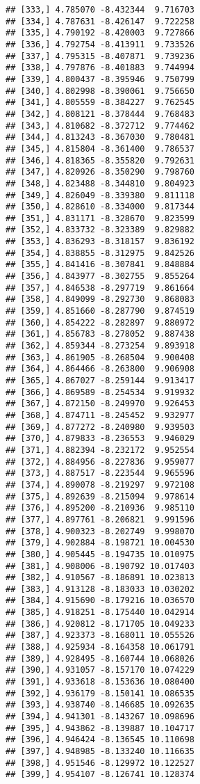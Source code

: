 \documentclass[]{book}
\theoremstyle{definition}
\theoremstyle{definition}
\theoremstyle{definition}
\theoremstyle{remark}
\begin{document}
\begin{verbatim}
## [333,] 4.785070 -8.432344  9.716703
## [334,] 4.787631 -8.426147  9.722258
## [335,] 4.790192 -8.420003  9.727866
## [336,] 4.792754 -8.413911  9.733526
## [337,] 4.795315 -8.407871  9.739236
## [338,] 4.797876 -8.401883  9.744994
## [339,] 4.800437 -8.395946  9.750799
## [340,] 4.802998 -8.390061  9.756650
## [341,] 4.805559 -8.384227  9.762545
## [342,] 4.808121 -8.378444  9.768483
## [343,] 4.810682 -8.372712  9.774462
## [344,] 4.813243 -8.367030  9.780481
## [345,] 4.815804 -8.361400  9.786537
## [346,] 4.818365 -8.355820  9.792631
## [347,] 4.820926 -8.350290  9.798760
## [348,] 4.823488 -8.344810  9.804923
## [349,] 4.826049 -8.339380  9.811118
## [350,] 4.828610 -8.334000  9.817344
## [351,] 4.831171 -8.328670  9.823599
## [352,] 4.833732 -8.323389  9.829882
## [353,] 4.836293 -8.318157  9.836192
## [354,] 4.838855 -8.312975  9.842526
## [355,] 4.841416 -8.307841  9.848884
## [356,] 4.843977 -8.302755  9.855264
## [357,] 4.846538 -8.297719  9.861664
## [358,] 4.849099 -8.292730  9.868083
## [359,] 4.851660 -8.287790  9.874519
## [360,] 4.854222 -8.282897  9.880972
## [361,] 4.856783 -8.278052  9.887438
## [362,] 4.859344 -8.273254  9.893918
## [363,] 4.861905 -8.268504  9.900408
## [364,] 4.864466 -8.263800  9.906908
## [365,] 4.867027 -8.259144  9.913417
## [366,] 4.869589 -8.254534  9.919932
## [367,] 4.872150 -8.249970  9.926453
## [368,] 4.874711 -8.245452  9.932977
## [369,] 4.877272 -8.240980  9.939503
## [370,] 4.879833 -8.236553  9.946029
## [371,] 4.882394 -8.232172  9.952554
## [372,] 4.884956 -8.227836  9.959077
## [373,] 4.887517 -8.223544  9.965596
## [374,] 4.890078 -8.219297  9.972108
## [375,] 4.892639 -8.215094  9.978614
## [376,] 4.895200 -8.210936  9.985110
## [377,] 4.897761 -8.206821  9.991596
## [378,] 4.900323 -8.202749  9.998070
## [379,] 4.902884 -8.198721 10.004530
## [380,] 4.905445 -8.194735 10.010975
## [381,] 4.908006 -8.190792 10.017403
## [382,] 4.910567 -8.186891 10.023813
## [383,] 4.913128 -8.183033 10.030202
## [384,] 4.915690 -8.179216 10.036570
## [385,] 4.918251 -8.175440 10.042914
## [386,] 4.920812 -8.171705 10.049233
## [387,] 4.923373 -8.168011 10.055526
## [388,] 4.925934 -8.164358 10.061791
## [389,] 4.928495 -8.160744 10.068026
## [390,] 4.931057 -8.157170 10.074229
## [391,] 4.933618 -8.153636 10.080400
## [392,] 4.936179 -8.150141 10.086535
## [393,] 4.938740 -8.146685 10.092635
## [394,] 4.941301 -8.143267 10.098696
## [395,] 4.943862 -8.139887 10.104717
## [396,] 4.946424 -8.136545 10.110698
## [397,] 4.948985 -8.133240 10.116635
## [398,] 4.951546 -8.129972 10.122527
## [399,] 4.954107 -8.126741 10.128374

\end{verbatim}
\end{document}
